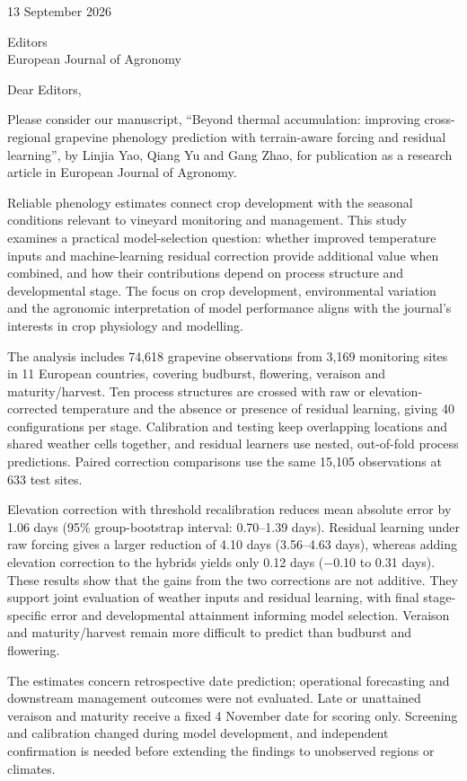 \documentclass[a4paper,11pt]{article}
\begin{document}
13 September 2026

Editors\\
European Journal of Agronomy

Dear Editors,

Please consider our manuscript, “Beyond thermal accumulation: improving cross-regional grapevine phenology prediction with terrain-aware forcing and residual learning”, by Linjia Yao, Qiang Yu and Gang Zhao, for publication as a research article in European Journal of Agronomy.

Reliable phenology estimates connect crop development with the seasonal conditions relevant to vineyard monitoring and management. This study examines a practical model-selection question: whether improved temperature inputs and machine-learning residual correction provide additional value when combined, and how their contributions depend on process structure and developmental stage. The focus on crop development, environmental variation and the agronomic interpretation of model performance aligns with the journal’s interests in crop physiology and modelling.

The analysis includes 74,618 grapevine observations from 3,169 monitoring sites in 11 European countries, covering budburst, flowering, veraison and maturity/harvest. Ten process structures are crossed with raw or elevation-corrected temperature and the absence or presence of residual learning, giving 40 configurations per stage. Calibration and testing keep overlapping locations and shared weather cells together, and residual learners use nested, out-of-fold process predictions. Paired correction comparisons use the same 15,105 observations at 633 test sites.

Elevation correction with threshold recalibration reduces mean absolute error by 1.06 days (95\% group-bootstrap interval: 0.70–1.39 days). Residual learning under raw forcing gives a larger reduction of 4.10 days (3.56–4.63 days), whereas adding elevation correction to the hybrids yields only 0.12 days (−0.10 to 0.31 days). These results show that the gains from the two corrections are not additive. They support joint evaluation of weather inputs and residual learning, with final stage-specific error and developmental attainment informing model selection. Veraison and maturity/harvest remain more difficult to predict than budburst and flowering.

The estimates concern retrospective date prediction; operational forecasting and downstream management outcomes were not evaluated. Late or unattained veraison and maturity receive a fixed 4 November date for scoring only. Screening and calibration changed during model development, and independent confirmation is needed before extending the findings to unobserved regions or climates.
\end{document}
